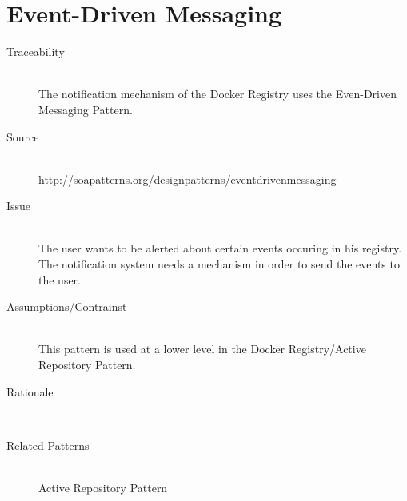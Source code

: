 \section{Event-Driven Messaging}

\begin{description}

\item[Traceability]~\\
The notification mechanism of the Docker Registry uses the Even-Driven Messaging Pattern.

\item[Source]~\\
http://soapatterns.org/designpatterns/eventdrivenmessaging

\item[Issue]~\\ The user wants to be alerted about certain events occuring in his registry.
The notification system needs a mechanism in order to send the events to the user.

\item[Assumptions/Contrainst]~\\ This pattern is used at a lower level in the Docker Registry/Active Repository Pattern.


\item[Rationale]~\\ 


\item [Related Patterns]~\\
Active Repository Pattern


\end{description}

